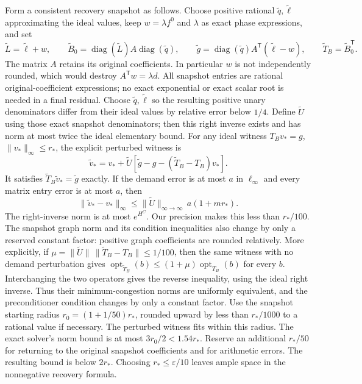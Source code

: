 \documentclass[11pt]{article}
\theoremstyle{definition}\newtheorem{definition}[theorem]{Definition}
\theoremstyle{remark}\newtheorem{remark}[theorem]{Remark}
\newcommand{\diag}{\operatorname{diag}}
\begin{document}
Form a consistent recovery snapshot as follows. Choose positive rational
$\widetilde q,\widetilde\ell$ approximating the ideal values, keep
$w=\lambda f^0$ and $\lambda$ as exact phase expressions, and set
\[
 \widetilde L=\widetilde\ell+w,\qquad
 \widetilde B_0=\diag(\widetilde L)A\diag(\widetilde q),\qquad
 \widetilde g=\diag(\widetilde q)A^{\mathsf T}(\widetilde\ell-w),
 \qquad \widetilde T_B=\widetilde B_0^{\mathsf T}.
\]
The matrix $A$ retains its original coefficients. In particular $w$ is
not independently rounded, which would destroy $A^{\mathsf T}w=\lambda d$.
All snapshot entries are rational original-coefficient expressions;
no exact exponential or exact scalar root is needed in a final residual.
Choose $\widetilde q,\widetilde\ell$ so the resulting positive unary
denominators differ from their ideal values by relative error below
$1/4$. Define $\widetilde U$ using those exact snapshot denominators;
then this right inverse exists and has
norm at most twice the ideal elementary bound. For any ideal witness
$T_Bv_*=g$, $\|v_*\|_\infty\le r_*$, the explicit perturbed witness is
\begin{equation}\label{eq:perturbation-witness}
 \widetilde v_*=v_*+\widetilde U
     [\widetilde g-g-(\widetilde T_B-T_B)v_*].
\end{equation}
It satisfies $\widetilde T_B\widetilde v_*=\widetilde g$ exactly.
If the demand error is at most $a$ in $\ell_\infty$ and every matrix
entry error is at most $a$, then
\[
 \|\widetilde v_*-v_*\|_\infty
 \le\|\widetilde U\|_{\infty\to\infty}\,a(1+mr_*).
\]
The right-inverse norm is at most $e^{H^C}$. Our precision makes this
less than $r_*/100$. The snapshot graph norm and its condition
inequalities also change by only a reserved constant factor: positive
graph coefficients are rounded relatively. More explicitly, if
$\mu=\|\widetilde U\|\,\|\widetilde T_B-T_B\|\le1/100$, then the same
witness with no demand perturbation gives
$\operatorname{opt}_{\widetilde T_B}(b)
\le(1+\mu)\operatorname{opt}_{T_B}(b)$ for every $b$.
Interchanging the two operators gives the reverse inequality, using
the ideal right inverse. Thus their minimum-congestion norms are
uniformly equivalent, and the preconditioner condition changes by only
a constant factor. Use the snapshot starting radius
$r_0=(1+1/50)r_*$, rounded upward by less than $r_*/1000$ to a rational
value if necessary. The perturbed witness fits within this radius.
The exact solver's norm bound is at most $3r_0/2<1.54r_*$.
Reserve an additional $r_*/50$ for returning to the original snapshot
coefficients and for arithmetic errors. The resulting bound is below
$2r_*$. Choosing $r_*\le\varepsilon/10$ leaves ample space in the
nonnegative recovery formula.
\end{document}
